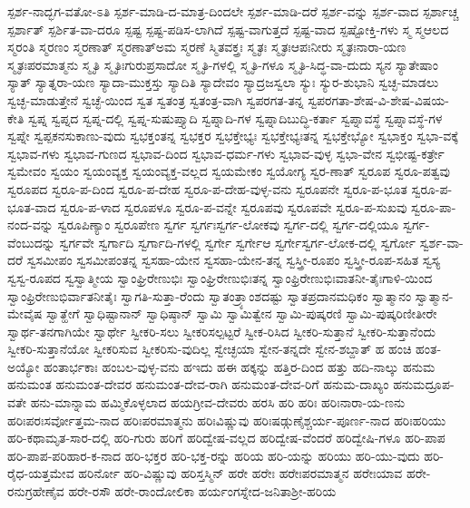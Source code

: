 {ಸ್ಪರ್ಶ-ನಾದ್ಭಗ-ವತೋ-ಽತಿ
ಸ್ಪರ್ಶ-ಮಾಡಿ-ದ-ಮಾತ್ರ-ದಿಂದಲೇ
ಸ್ಪರ್ಶ-ಮಾಡಿ-ದರೆ
ಸ್ಪರ್ಶ-ವನ್ನು
ಸ್ಪರ್ಶ-ವಾದ
ಸ್ಪರ್ಶಾಚ್ಚ
ಸ್ಪರ್ಶಾತ್
ಸ್ಪರ್ಶಿತ-ವಾ-ದರೂ
ಸ್ಪಷ್ಟ
ಸ್ಪಷ್ಟ-ಪಡಿಸ-ಲಾಗಿದೆ
ಸ್ಪಷ್ಟ-ವಾಗುತ್ತದೆ
ಸ್ಪಷ್ಟ-ವಾದ
ಸ್ಪಷ್ಟೋಕ್ತಿ-ಗಳು
ಸ್ಮ
ಸ್ಮಆಲದ
ಸ್ಮರಂತಿ
ಸ್ಮರಣಂ
ಸ್ಮರಣಾತ್
ಸ್ಮರಣಾತ್ಅಮ
ಸ್ಮರಣೆ
ಸ್ಮಿತವಕ್ತ್ರಃ
ಸ್ಮೃತಃ
ಸ್ಮೃತಃಆಪಃನೀರು
ಸ್ಮೃತಃನಾರಾ-ಯಣ
ಸ್ಮೃತಃಪರಮಾತ್ಮನು
ಸ್ಮೃತಿ
ಸ್ಮೃತಿಃಗುರುಪ್ರಸಾದೋ
ಸ್ಮೃತಿ-ಗಳಲ್ಲಿ
ಸ್ಮೃತಿ-ಗಳೂ
ಸ್ಮೃತಿ-ಸಿದ್ಧ-ವಾ-ದುದು
ಸ್ಯನ
ಸ್ಯಾತೇಷಾಂ
ಸ್ಯಾತ್
ಸ್ಯಾತ್ನರಾ-ಯಣ
ಸ್ಯಾದಾ-ಮುಕ್ತಸ್ತು
ಸ್ಯಾದಿತಿ
ಸ್ಯಾದೇವಂ
ಸ್ಯಾದ್ರಜಸ್ವಲಾ
ಸ್ಯುಃ
ಸ್ಯುರ-ಶುಭಾನಿ
ಸ್ವಚ್ಛ-ಮಾಡಲು
ಸ್ವಚ್ಛ-ಮಾಡುತ್ತೇನೆ
ಸ್ವಚ್ಛೆ-ಯಿಂದ
ಸ್ವತ
ಸ್ವತಂತ್ರ
ಸ್ವತಂತ್ರ-ವಾಗಿ
ಸ್ವಪರಗತ-ತನ್ನ
ಸ್ವಪರಗತಾ-ಶೇಷ-ವಿ-ಶೇಷ-ವಿಷಯ-ಕೇತಿ
ಸ್ವಪ್ನ
ಸ್ವಪ್ನದ
ಸ್ವಪ್ನ-ದಲ್ಲಿ
ಸ್ವಪ್ನ-ಸುಷುಪ್ತ್ಯಾದಿ
ಸ್ವಪ್ನಾದಿ-ಗಳ
ಸ್ವಪ್ನಾದಿಬುದ್ಧಿ-ಕರ್ತಾ
ಸ್ವಪ್ನಾವಸ್ಥೆ
ಸ್ವಪ್ನಾವಸ್ಥೆ-ಗಳ
ಸ್ವಪ್ನೇ
ಸ್ವಪ್ಪಕನಸುಕಾಣು-ವುದು
ಸ್ವಭಕ್ತಂತನ್ನ
ಸ್ವಭಕ್ತರ
ಸ್ವಭಕ್ತೇಭ್ಯಃ
ಸ್ವಭಕ್ತೇಭ್ಯಃತನ್ನ
ಸ್ವಭಕ್ತೇಭ್ಯೋ
ಸ್ವಭಾಕ್ತಂ
ಸ್ವಭಾ-ವಕ್ಕೆ
ಸ್ವಭಾವ-ಗಳು
ಸ್ವಭಾವ-ಗುಣದ
ಸ್ವಭಾವ-ದಿಂದ
ಸ್ವಭಾವ-ಧರ್ಮ-ಗಳು
ಸ್ವಭಾವ-ವುಳ್ಳ
ಸ್ವಭಾ-ವೇನ
ಸ್ವಭೀಷ್ಟ-ಕರ್ತ್ರೇ
ಸ್ವಮೇವಂ
ಸ್ವಯಂ
ಸ್ವಯಂವ್ಯಕ್ತ
ಸ್ವಯಂವ್ಯಕ್ತ-ವಲ್ಲದ
ಸ್ವಯಮೇಕಂ
ಸ್ವಯೋಗ್ಯ
ಸ್ವರ-ಣಾತ್
ಸ್ವರೂಪ
ಸ್ವರೂ-ಪತ್ವವು
ಸ್ವರೂಪದ
ಸ್ವರೂ-ಪ-ದಿಂದ
ಸ್ವರೂ-ಪ-ದೇಹ
ಸ್ವರೂ-ಪ-ದೇಹ-ವುಳ್ಳ-ವನು
ಸ್ವರೂಪನೇ
ಸ್ವರೂ-ಪ-ಭೂತ
ಸ್ವರೂ-ಪ-ಭೂತ-ವಾದ
ಸ್ವರೂ-ಪ-ಳಾದ
ಸ್ವರೂಪಳೂ
ಸ್ವರೂ-ಪ-ವನ್ನೇ
ಸ್ವರೂಪವು
ಸ್ವರೂಪವೇ
ಸ್ವರೂ-ಪ-ಸುಖವು
ಸ್ವರೂ-ಪಾ-ನಂದ-ವನ್ನು
ಸ್ವರೂಪಿಣ್ಯಾಂ
ಸ್ವರೂಪೇಣ
ಸ್ವರ್ಗ
ಸ್ವರ್ಗಃಸ್ವರ್ಗ-ಲೋಕವು
ಸ್ವರ್ಗ-ದಲ್ಲಿ
ಸ್ವರ್ಗ-ದಲ್ಲಿಯೂ
ಸ್ವರ್ಗ-ವೆಂಬುದನ್ನು
ಸ್ವರ್ಗವೇ
ಸ್ವರ್ಗಾದಿ
ಸ್ವರ್ಗಾದಿ-ಗಳಲ್ಲಿ
ಸ್ವರ್ಗೇ
ಸ್ವರ್ಗೇಆ
ಸ್ವರ್ಗೇಸ್ವರ್ಗ-ಲೋಕ-ದಲ್ಲಿ
ಸ್ವರ್ಗೋ
ಸ್ವರ್ಶ-ವಾ-ದರೆ
ಸ್ವಸಮೀಪಂ
ಸ್ವಸಮೀಪಂತನ್ನ
ಸ್ವಸಹಾ-ಯೇನ
ಸ್ವಸಹಾ-ಯೇನ-ತನ್ನ
ಸ್ವಸ್ತ್ರೀ-ರೂಪಂ
ಸ್ವಸ್ತ್ರೀ-ರೂಪ-ಸಹಿತ
ಸ್ವಸ್ಯ
ಸ್ವಸ್ವ-ರೂಪದ
ಸ್ವಸ್ವಾತ್ಮೀಯ
ಸ್ವಾಂಘ್ರಿರೇಣುಭಿಃ
ಸ್ವಾಂಘ್ರಿರೇಣುಭಿಃತನ್ನ
ಸ್ವಾಂಫ್ರಿರೇಣುಭಿಃವಾತನೀ-ತೈಃಗಾಳಿ-ಯಿಂದ
ಸ್ವಾಂಫ್ರಿರೇಣುಭಿರ್ವಾತನೀತೈಃ
ಸ್ವಾಗತಿ-ಸುತ್ತಾ-ರೆಂದು
ಸ್ವಾತಂತ್ರ್ಯಾಂಶದಷ್ಟು
ಸ್ವಾತಪ್ರದಾನಮಧಿಕಂ
ಸ್ವಾತ್ಮಾನಂ
ಸ್ವಾತ್ಮಾನ-ಮೇವೈಷ
ಸ್ವಾತ್ಹೇಗೆ
ಸ್ವಾಧಿಷ್ಟಾನಾನ್
ಸ್ವಾಧಿಷ್ಠಾನ್
ಸ್ವಾಮಿ
ಸ್ವಾಮಿತ್ವೇನ
ಸ್ವಾಮಿ-ಪುಷ್ಕರಣಿ
ಸ್ವಾಮಿ-ಪುಷ್ಕರಿಣೀತೀರೇ
ಸ್ವಾರ್ಥ-ತನಗಾಗಿಯೇ
ಸ್ವಾರ್ಥೇ
ಸ್ವೀಕರಿ-ಸಲು
ಸ್ವೀಕರಿಸಲ್ಪಟ್ಟರೆ
ಸ್ವೀಕ-ರಿಸಿದ
ಸ್ವೀಕರಿ-ಸುತ್ತಾನೆ
ಸ್ವೀಕರಿ-ಸುತ್ತಾನೆಂದು
ಸ್ವೀಕರಿ-ಸುತ್ತಾನೆಯೋ
ಸ್ವೀಕರಿಸುವ
ಸ್ವೀಕರಿಸು-ವುದಿಲ್ಲ
ಸ್ವೇಚ್ಛಯಾ
ಸ್ವೇನ-ತನ್ನದೇ
ಸ್ವೇನ-ಶಬ್ದಾತ್
ಹ
ಹಂಚಿ
ಹಂತ-ಅಯ್ಯೋ
ಹಂತಾರ್ಭಕಾಃ
ಹಂಬಲ-ವುಳ್ಳ-ವನು
ಹಇದು
ಹಈ
ಹಕ್ಕನ್ನು
ಹತ್ತಿರ-ದಿಂದ
ಹತ್ತು
ಹದಿ-ನಾಲ್ಕು
ಹನುಮ
ಹನುಮಂತ
ಹನುಮಂತ-ದೇವರ
ಹನುಮಂತ-ದೇವ-ರಾಗಿ
ಹನುಮಂತ-ದೇವ-ರಿಗೆ
ಹನುಮ-ದಾಖ್ಯಂ
ಹನುಮದ್ರೂಪ-ವತೇ
ಹನು-ಮಾನ್ನಾಮ
ಹಮ್ಮಿಕೊಳ್ಳಲಾದ
ಹಯಗ್ರೀವ-ದೇವರು
ಹರಸಿ
ಹರಿ
ಹರಿಃ
ಹರಿಃನಾರಾ-ಯ-ಣನು
ಹರಿಃಪರಃಸರ್ವೋತ್ತಮ-ನಾದ
ಹರಿಃಪರಮಾತ್ಮನು
ಹರಿಃವಿಷ್ಣುವು
ಹರಿಃಷಡ್ಗುಣೈಶ್ಚರ್ಯ-ಪೂರ್ಣ-ನಾದ
ಹರಿಃಹರಿಯು
ಹರಿ-ಕಥಾಮೃತ-ಸಾರ-ದಲ್ಲಿ
ಹರಿ-ಗುರು
ಹರಿಗೆ
ಹರಿದ್ವೇಷ-ವಲ್ಲದ
ಹರಿದ್ವೇಷ-ವೆಂದರೆ
ಹರಿದ್ವೇಷಿ-ಗಳೂ
ಹರಿ-ಪಾಪ
ಹರಿ-ಪಾಪ-ಪರಿಹಾರ-ಕ-ನಾದ
ಹರಿ-ಭಕ್ತರ
ಹರಿ-ಭಕ್ತ-ರನ್ನು
ಹರಿಯ
ಹರಿ-ಯನ್ನು
ಹರಿಯು
ಹರಿ-ಯು-ವುದು
ಹರಿ-ರೈಧ-ಯತ್ತಮೇವ
ಹರಿರ್ನೋ
ಹರಿ-ವಿಷ್ಣುವು
ಹರಿಸ್ತಸ್ಮಿನ್
ಹರೇ
ಹರೇಃ
ಹರೇಃಪರಮಾತ್ಮನ
ಹರೇಃಯಾವ
ಹರೇ-ರನುಗ್ರಹೇಣೈವ
ಹರೇ-ರಸೌ
ಹರೇ-ರಾಂದೋಲಿಕಾ
ಹರ್ಯಂಗಸ್ನೇದ-ಜನಿತಾಶ್ರೀ-ಹರಿಯ
}
